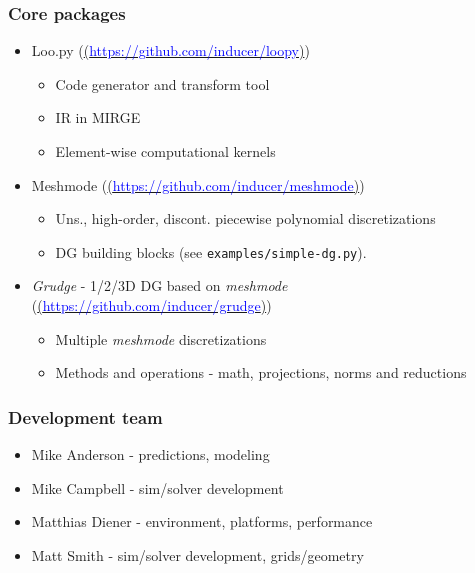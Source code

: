 \begin{frame}\frametitle{Core packages}
\begin{itemize}
  \item Loo.py (\href{https://github.com/inducer/loopy}{(\textcolor{blue}{https://github.com/inducer/loopy})})
  \begin{itemize}
    \item Code generator and transform tool
    \item IR in MIRGE
    \item Element-wise computational kernels
  \end{itemize}
  \item Meshmode (\href{https://github.com/inducer/meshmode}{(\textcolor{blue}{https://github.com/inducer/meshmode})})
  \begin{itemize}
    \item Uns., high-order, discont. piecewise polynomial discretizations 
    \item DG building blocks (see \texttt{examples/simple-dg.py}).
  \end{itemize}
  \item \textit{Grudge} - 1/2/3D DG based on \textit{meshmode} (\href{https://github.com/inducer/grudge}{(\textcolor{blue}{https://github.com/inducer/grudge})})
  \begin{itemize}
    \item Multiple \textit{meshmode} discretizations
    \item Methods and operations - math, projections, norms and reductions
  \end{itemize}
\end{itemize}
\end{frame}

\begin{frame}\frametitle{Development team}
\begin{multicols}{2}
\begin{itemize}
\item Mike Anderson - predictions, modeling
\item Mike Campbell - sim/solver development
\columnbreak
\item Matthias Diener - environment, platforms, performance
\item Matt Smith  - sim/solver development, grids/geometry
\end{itemize}
\end{multicols}
\end{frame}

